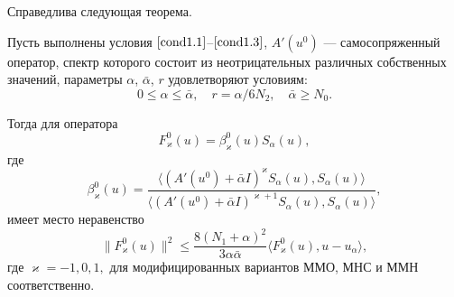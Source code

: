 Справедлива следующая теорема.
\begin{theorem}\label{teomodalpnomonot}
	Пусть выполнены условия $\eqref{cond1.1}$--$\eqref{cond1.3}$,
$A'(u^0)$ --- самосопряженный оператор, спектр которого состоит из неотрицательных различных собственных значений, параметры $\alpha$, $\bar{\alpha}$, $r$ удовлетворяют условиям:
	\begin{equation}\label{cond2.4}
	0\le\alpha\le\bar{\alpha}, \quad r=\alpha/6N_2, \quad \bar{\alpha}\ge N_0.
	\end{equation}
	
	Тогда для оператора
	$$F_\varkappa^0(u)=\beta_{\varkappa}^0(u)S_\alpha(u),$$ где 
	$$\beta_{\varkappa}^0(u)=\frac{\langle (A'(u^0)+\bar\alpha I)^{\varkappa}S_\alpha(u), S_\alpha(u)\rangle}{\langle (A'(u^0)+\bar\alpha I)^{\varkappa+1}S_\alpha(u), S_\alpha(u)\rangle},$$ имеет место неравенство
	$$\|F_\varkappa^0(u)\|^2\le\frac{8(N_1+\alpha)^2}{3\alpha\bar{\alpha}}\langle F_\varkappa^0(u), u-u_\alpha\rangle,$$
	где $\varkappa=-1, 0, 1,$ для модифицированных вариантов ММО, МНС и ММН соответственно.
\end{theorem} 
